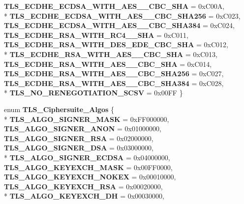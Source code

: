 \begin{DoxyCompactItemize}
{\bfseries T\-L\-S\-\_\-\-E\-C\-D\-H\-E\-\_\-\-E\-C\-D\-S\-A\-\_\-\-W\-I\-T\-H\-\_\-\-A\-E\-S\-\_\-\_\-\-C\-B\-C\-\_\-\-S\-H\-A} = 0x\-C00\-A, 
\\*
{\bfseries T\-L\-S\-\_\-\-E\-C\-D\-H\-E\-\_\-\-E\-C\-D\-S\-A\-\_\-\-W\-I\-T\-H\-\_\-\-A\-E\-S\-\_\-\_\-\-C\-B\-C\-\_\-\-S\-H\-A256} = 0x\-C023, 
{\bfseries T\-L\-S\-\_\-\-E\-C\-D\-H\-E\-\_\-\-E\-C\-D\-S\-A\-\_\-\-W\-I\-T\-H\-\_\-\-A\-E\-S\-\_\-\_\-\-C\-B\-C\-\_\-\-S\-H\-A384} = 0x\-C024, 
{\bfseries T\-L\-S\-\_\-\-E\-C\-D\-H\-E\-\_\-\-R\-S\-A\-\_\-\-W\-I\-T\-H\-\_\-\-R\-C4\-\_\-\_\-\-S\-H\-A} = 0x\-C011, 
{\bfseries T\-L\-S\-\_\-\-E\-C\-D\-H\-E\-\_\-\-R\-S\-A\-\_\-\-W\-I\-T\-H\-\_\-D\-E\-S\-\_\-\-E\-D\-E\-\_\-\-C\-B\-C\-\_\-\-S\-H\-A} = 0x\-C012, 
\\*
{\bfseries T\-L\-S\-\_\-\-E\-C\-D\-H\-E\-\_\-\-R\-S\-A\-\_\-\-W\-I\-T\-H\-\_\-\-A\-E\-S\-\_\-\_\-\-C\-B\-C\-\_\-\-S\-H\-A} = 0x\-C013, 
{\bfseries T\-L\-S\-\_\-\-E\-C\-D\-H\-E\-\_\-\-R\-S\-A\-\_\-\-W\-I\-T\-H\-\_\-\-A\-E\-S\-\_\-\_\-\-C\-B\-C\-\_\-\-S\-H\-A} = 0x\-C014, 
{\bfseries T\-L\-S\-\_\-\-E\-C\-D\-H\-E\-\_\-\-R\-S\-A\-\_\-\-W\-I\-T\-H\-\_\-\-A\-E\-S\-\_\-\_\-\-C\-B\-C\-\_\-\-S\-H\-A256} = 0x\-C027, 
{\bfseries T\-L\-S\-\_\-\-E\-C\-D\-H\-E\-\_\-\-R\-S\-A\-\_\-\-W\-I\-T\-H\-\_\-\-A\-E\-S\-\_\-\_\-\-C\-B\-C\-\_\-\-S\-H\-A384} = 0x\-C028, 
\\*
{\bfseries T\-L\-S\-\_\-\-N\-O\-\_\-\-R\-E\-N\-E\-G\-O\-T\-I\-A\-T\-I\-O\-N\-\_\-\-S\-C\-S\-V} = 0x00\-F\-F
 \}
\item 
enum {\bfseries T\-L\-S\-\_\-\-Ciphersuite\-\_\-\-Algos} \{ \\*
{\bfseries T\-L\-S\-\_\-\-A\-L\-G\-O\-\_\-\-S\-I\-G\-N\-E\-R\-\_\-\-M\-A\-S\-K} = 0x\-F\-F000000, 
{\bfseries T\-L\-S\-\_\-\-A\-L\-G\-O\-\_\-\-S\-I\-G\-N\-E\-R\-\_\-\-A\-N\-O\-N} = 0x01000000, 
{\bfseries T\-L\-S\-\_\-\-A\-L\-G\-O\-\_\-\-S\-I\-G\-N\-E\-R\-\_\-\-R\-S\-A} = 0x02000000, 
{\bfseries T\-L\-S\-\_\-\-A\-L\-G\-O\-\_\-\-S\-I\-G\-N\-E\-R\-\_\-\-D\-S\-A} = 0x03000000, 
\\*
{\bfseries T\-L\-S\-\_\-\-A\-L\-G\-O\-\_\-\-S\-I\-G\-N\-E\-R\-\_\-\-E\-C\-D\-S\-A} = 0x04000000, 
{\bfseries T\-L\-S\-\_\-\-A\-L\-G\-O\-\_\-\-K\-E\-Y\-E\-X\-C\-H\-\_\-\-M\-A\-S\-K} = 0x00\-F\-F0000, 
{\bfseries T\-L\-S\-\_\-\-A\-L\-G\-O\-\_\-\-K\-E\-Y\-E\-X\-C\-H\-\_\-\-N\-O\-K\-E\-X} = 0x00010000, 
{\bfseries T\-L\-S\-\_\-\-A\-L\-G\-O\-\_\-\-K\-E\-Y\-E\-X\-C\-H\-\_\-\-R\-S\-A} = 0x00020000, 
\\*
{\bfseries T\-L\-S\-\_\-\-A\-L\-G\-O\-\_\-\-K\-E\-Y\-E\-X\-C\-H\-\_\-\-D\-H} = 0x00030000, 

\end{DoxyCompactItemize}
